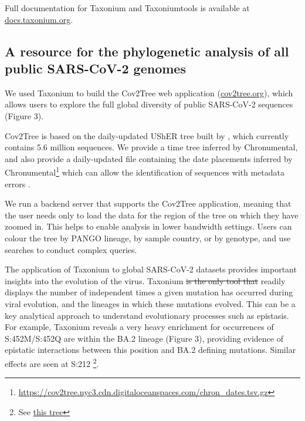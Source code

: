\documentclass[twocolumn]{bioRxiv}
\providecommand{\DIFdel}[1]{{\protect\color{red}\sout{#1}}}
\providecommand{\DIFdelbegin}{}
\providecommand{\DIFdelend}{}
\begin{document}
Full documentation for Taxonium and Taxoniumtools is available at \href{http://docs.taxonium.org}{docs.taxonium.org}.

\subsection*{A resource for the phylogenetic analysis of all public SARS-CoV-2 genomes}

We used Taxonium to build the Cov2Tree web application (\href{http://cov2tree.org}{cov2tree.org}), which allows users to explore the full global diversity of public SARS-CoV-2 sequences (Figure 3). 

Cov2Tree is based on the daily-updated UShER tree built by \cite{McBroome2021}, which currently contains 5.6 million sequences. We provide a time tree inferred by Chronumental, and also provide a daily-updated file containing the date placements inferred by Chronumental\footnote{\url{https://cov2tree.nyc3.cdn.digitaloceanspaces.com/chron_dates.tsv.gz}} which can allow the identification of sequences with metadata errors \citep{chronumental}.

We run a backend server that supports the Cov2Tree application, meaning that the user needs only to load the data for the region of the tree on which they have zoomed in. This helps to enable analysis in lower bandwidth settings. Users can colour the tree by PANGO lineage, by sample country, or by genotype, and use searches to conduct complex queries.

The application of Taxonium to global SARS-CoV-2 datasets provides important insights into the evolution of the virus. Taxonium \DIFdelbegin \DIFdel{is the only tool that }\DIFdelend readily displays the number of independent times a given mutation has occurred during viral evolution, and the lineages in which these mutations evolved. This can be a key analytical approach to understand evolutionary processes such as epistasis. For example, Taxonium reveals a very heavy enrichment for occurrences of S:452M/S:452Q are within the BA.2 lineage (Figure 3), providing evidence of epistatic interactions between this position and BA.2 defining mutations. Similar effects are seen at S:212 \footnote{See \href{https://cov2tree.org/?srch=\%5B\%7B\%22key\%22\%3A\%22aa1\%22\%2C\%22type\%22\%3A\%22mutation\%22\%2C\%22method\%22\%3A\%22mutation\%22\%2C\%22text\%22\%3A\%22\%22\%2C\%22gene\%22\%3A\%22S\%22\%2C\%22position\%22\%3A\%22212\%22\%2C\%22new_residue\%22\%3A\%22any\%22\%2C\%22min_tips\%22\%3A\%2210\%22\%7D\%5D&color=\%7B\%22field\%22\%3A\%22None\%22\%7D}{this tree}}.
\end{document}
